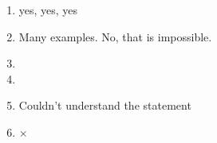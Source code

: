 \begin{enumerate}
	\item yes, yes, yes
	
	\item Many examples. No, that is impossible.
	
	\item 
	
	\item 
	
	\item Couldn't understand the statement
	
	\item $\times$
	
\end{enumerate}